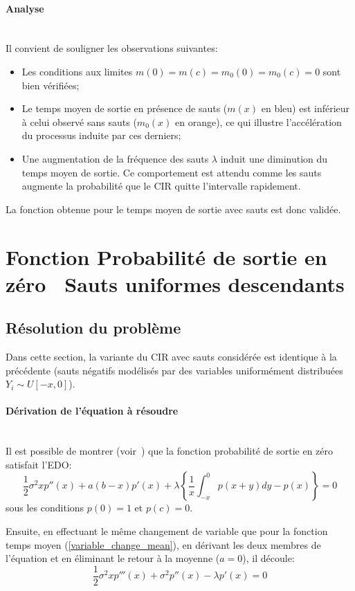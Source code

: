\FloatBarrier\paragraph{Analyse}\phantom{}\\
Il convient de souligner les observations suivantes:
\begin{itemize}
    \item Les conditions aux limites \( m(0) = m(c) = m_0(0) = m_0(c) = 0 \) sont bien vérifiées;
    \item Le temps moyen de sortie en présence de sauts ($m(x)$ en bleu) est inférieur à celui observé sans sauts ($m_0(x)$ en orange), ce qui illustre l'accélération du processus induite par ces derniers;
    \item Une augmentation de la fréquence des sauts $\lambda$ induit une diminution du temps moyen de sortie. Ce comportement est attendu comme les sauts augmente la probabilité que le \acs{CIR} quitte l'intervalle rapidement.
\end{itemize}
La fonction obtenue pour le temps moyen de sortie avec sauts est donc validée.

\section{Fonction Probabilité de sortie en zéro \textemdash~Sauts uniformes descendants}\label{subsection_probability_jumps}
\subsection{Résolution du problème}
Dans cette section, la variante du \ac{CIR} avec sauts considérée est identique à la précédente (sauts négatifs modélisés par des variables uniformément distribuées $Y_i\sim U[-x,0]$).

\paragraph{Dérivation de l'équation à résoudre}\phantom{}\\
Il est possible de montrer (voir~\cite{lefebvre2007}) que la fonction probabilité de sortie en zéro satisfait l'\acs{EDO}:
\begin{equation}\label{probability_ide}
    \frac{1}{2}\sigma^2xp''(x)+a(b-x)p'(x)+\lambda\left\{\frac{1}{x}\int_{-x}^0p(x+y)dy-p(x)\right\}=0
\end{equation}
sous les conditions $p(0)=1$ et $p(c)=0$.

Ensuite, en effectuant le même changement de variable que pour la fonction temps moyen (\ref{variable_change_mean}), en dérivant les deux membres de l'équation et en éliminant le retour à la moyenne ($a=0$), il découle:
\begin{equation}\label{probability_3rd_order}
    \frac{1}{2}\sigma^2xp'''(x)+\sigma^2p''(x)-\lambda p'(x)=0
\end{equation}
